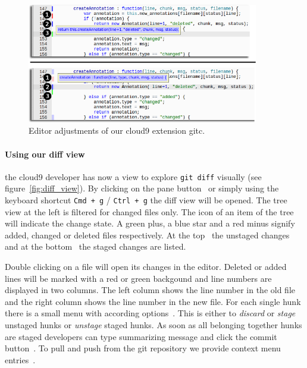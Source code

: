 \begin{figure}
   \centering
   \includegraphics[width=0.9\textwidth]{images/extension_tooltip_comparison.png}
   \caption{Editor adjustments of our cloud9 extension gitc.}
   \label{fig:editor}
\end{figure}

\paragraph{Using our diff view} the cloud9 developer has now a view to explore \texttt{git diff} visually (see figure~\ref{fig:diff_view}).
By clicking on the pane button~ or simply using the keyboard shortcut  \texttt{Cmd + g} / \texttt{Ctrl + g} the diff view will be opened.
The tree view at the left is filtered for changed files only.
The icon of an item of the tree will indicate the change state.
A green plus, a blue star and a red minus signify added, changed or deleted files respectively.
At the top~ the unstaged changes and at the bottom~ the staged changes are listed.

Double clicking on a file will open its changes in the editor.
Deleted or added lines will be marked with a red or green backgound and line numbers are displayed in two columns.
The left column shows the line number in the old file and the right column shows the line number in the new file.
For each single hunk there is a small menu with according options~.
This is either to \emph{discard} or \emph{stage} unstaged hunks or \emph{unstage} staged hunks.
As soon as all belonging together hunks are staged developers can type summarizing message and click the commit button~.
To pull and push from the git repository we provide context menu entries~.

